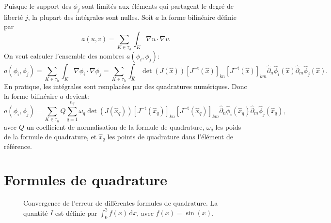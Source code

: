 Puisque le support des $\phi_j$ sont limit\'es aux \'el\'ements qui partagent le degr\'e de libert\'e $j$, la plupart des int\'egrales sont nulles. Soit $a$ la forme bilin\'eaire d\'efinie par
\begin{equation}
a(u, v) = \sum_{K\in\tau_h}\int_K \nabla u\cdot \nabla v.
\end{equation}
On veut calculer l'ensemble des nombres $a(\phi_i, \phi_j)$:
\begin{equation}
a(\phi_i, \phi_j) = \sum_{K\in\tau_h}\int_K \nabla \phi_i\cdot \nabla \phi_j = \sum_{K\in\tau_h}\int_{\hat K} \det(J(\hat x)) [J^{-\mathrm t}(\hat x)]_{kn} [J^{-\mathrm t}(\hat x)]_{km} \hat\partial_n \hat\phi_i(\hat x)\hat\partial_m \hat\phi_j(\hat x).
\end{equation}
En pratique, les int\'egrales sont remplac\'ees par des quadratures num\'eriques. Donc la forme bilin\'eaire $a$ devient:
\begin{equation}
a(\phi_i, \phi_j) = \sum_{K\in\tau_h} Q \sum_{q = 1}^{n_q}\omega_q \det(J(\hat x_q)) [J^{-\mathrm t}(\hat x_q)]_{kn} [J^{-\mathrm t}(\hat x_q)]_{km} \hat\partial_n \hat\phi_i(\hat x_q)\hat\partial_m \hat\phi_j(\hat x_q),
\end{equation}
avec $Q$ un coefficient de normalisation de la formule de quadrature, $\omega_q$ les poids de la formule de quadrature, et $\hat x_q$ les points de quadrature dans l'\'el\'ement de r\'ef\'erence.

\section{Formules de quadrature}
\begin{figure}
  \begin{center}
    
    \caption{Convergence de l'erreur de diff\'erentes formules de quadrature. La quantit\'e $I$ est d\'efinie par $\int_0^2 f(x)\,\mathrm dx$, avec $f(x) = \sin(x)$.}
    \label{fig:quadrature-convergence-1d}
  \end{center}
\end{figure}

